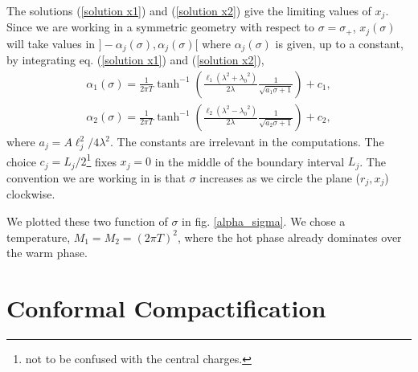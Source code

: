 The solutions (\ref{solution x1}) and (\ref{solution x2}) give the limiting values of $x_j$. Since we are working in a symmetric geometry with respect to $\sigma = \sigma_+$, $x_j(\sigma)$ will take values in $]-\alpha_j(\sigma),\alpha_j(\sigma)[$ where $\alpha_j(\sigma)$ is given, up to a constant, by integrating eq. (\ref{solution x1}) and (\ref{solution x2}),
\begin{subequations}\label{mysolved}
\begin{align}
    \alpha_1(\sigma) = \frac{1}{2\pi T}\tanh^{-1}\left(\frac{\ell_1\left(\lambda^2+{\lambda_0}^2\right)}{2\lambda}\frac{1}{\sqrt{a_1\sigma+1}}\right) + c_1,\label{solved x1}\\
    \alpha_2(\sigma) = \frac{1}{2\pi T}\tanh^{-1}\left(\frac{\ell_2\left(\lambda^2-{\lambda_0}^2\right)}{2\lambda}\frac{1}{\sqrt{a_2\sigma+1}}\right) + c_2,\label{solved x2}
\end{align}
\end{subequations}
where $a_j=A\ell_j^2/4\lambda^2$. The constants are irrelevant in the computations. The choice $c_j=L_j/2$\footnote{not to be confused with the central charges.} fixes $x_j=0$ in the middle of the boundary interval $L_j$. The convention we are working in is that $\sigma$ increases as we circle the plane ($r_j,x_j$) clockwise.

We plotted these two function of $\sigma$ in fig. \ref{alpha_sigma}. We chose a temperature, $M_1=M_2=\left(2\pi T\right)^2$, where the hot phase already dominates over the warm phase.

\section{Conformal Compactification}

